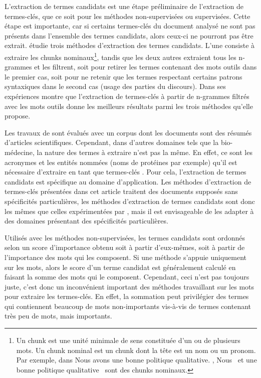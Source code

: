   L'extraction de termes candidats est une étape préliminaire de l'extraction de
  termes-clés, que ce soit pour les méthodes non-supervisées ou supervisées.
  Cette étape est importante, car si certains termes-clés du document analysé ne
  sont pas présents dans l'ensemble des termes candidats, alors ceux-ci ne
  pourront pas être extrait. \citet{hulth2003keywordextraction} étudie trois
  méthodes d'extraction des termes candidats. L'une consiste à extraire les
  chunks nominaux\footnote{Un chunk est une unité minimale de sens constituée
  d'un ou de plusieurs mots. Un chunk nominal est un chunk dont la tête est un
  nom ou un pronom. Par exemple, dans \og Nous avons une bonne politique
  qualitative. \fg, \og Nous \fg\ et \og une bonne politique qualitative \fg\ 
  sont des chunks nominaux.}, tandis que les deux autres extraient tous les
  n-grammes et les filtrent, soit pour retirer les termes contenant des mots
  outils dans le premier cas, soit pour ne retenir que les termes respectant
  certains patrons syntaxiques dans le second cas (usage des parties du
  discours). Dans ses expériences \citet{hulth2003keywordextraction} montre que
  l'extraction de termes-clés à partir de n-grammes filtrés avec les mots outils
  donne les meilleurs résultats parmi les trois méthodes qu'elle propose.

  Les travaux de \citet{hulth2003keywordextraction} sont évalués avec un corpus
  dont les documents sont des résumés d'articles scientifiques. Cependant, dans
  d'autres domaines tels que la bio-médecine, la nature des termes à extraire
  n'est pas la même. En effet, ce sont les acronymes et les entités nommées
  (noms de protéines par exemple) qu'il est nécessaire d'extraire en tant que
  termes-clés \cite{nobata2008kleio}. Pour cela, l'extraction de termes
  candidats est spécifique au domaine d'application. Les méthodes d'extraction
  de termes-clés présentées dans cet article traitent des documents supposés
  sans spécificités particulières, les méthodes d'extraction de termes candidats
  sont donc les mêmes que celles expérimentées par
  \citet{hulth2003keywordextraction}, mais il est envisageable de les adapter à
  des domaines présentant des spécificités particulières.

  Utilisés avec les méthodes non-supervisées, les termes candidats sont ordonnés
  selon un score d'importance obtenu soit à partir d'eux-mêmes, soit à partir de
  l'importance des mots qui les composent. Si une méthode s'appuie uniquement
  sur les mots, alors le score d'un terme candidat est généralement calculé en
  faisant la somme des mots qui le composent. Cependant, ceci n'est pas toujours
  juste, c'est donc un inconvénient important des méthodes travaillant sur les
  mots pour extraire les termes-clés. En effet, la sommation peut privilégier
  des termes qui contiennent beaucoup de mots non-importants vis-à-vis de termes
  contenant très peu de mots, mais importants.
  
